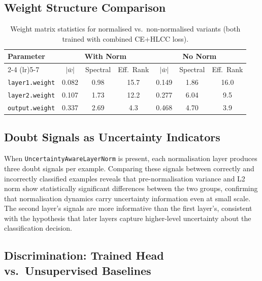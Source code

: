 \documentclass[11pt,a4paper]{article}
\begin{document}
\subsection{Weight Structure Comparison}

\begin{table}[H]
\centering
\caption{Weight matrix statistics for normalised vs.\ non-normalised variants
(both trained with combined CE+HLCC loss).}
\label{tab:weights}
\begin{tabular}{@{}lcccccc@{}}
\toprule
Parameter & \multicolumn{3}{c}{With Norm} & \multicolumn{3}{c}{No Norm} \\
\cmidrule(lr){2-4} \cmidrule(lr){5-7}
 & $|\bar{w}|$ & Spectral & Eff.\ Rank & $|\bar{w}|$ & Spectral & Eff.\ Rank \\
\midrule
\texttt{layer1.weight} & 0.082 & 0.98 & 15.7 & 0.149 & 1.86 & 16.0 \\
\texttt{layer2.weight} & 0.107 & 1.73 & 12.2 & 0.277 & 6.04 & 9.5 \\
\texttt{output.weight} & 0.337 & 2.69 & 4.3  & 0.468 & 4.70 & 3.9 \\
\bottomrule
\end{tabular}
\end{table}

\subsection{Doubt Signals as Uncertainty Indicators}

When \texttt{UncertaintyAwareLayerNorm} is present, each normalisation
layer produces three doubt signals per example.  Comparing these
signals between correctly and incorrectly classified examples reveals
that pre-normalisation variance and L2 norm show statistically
significant differences between the two groups, confirming that
normalisation dynamics carry uncertainty information even at small
scale.  The second layer's signals are more informative than the
first layer's, consistent with the hypothesis that later layers
capture higher-level uncertainty about the classification decision.


\subsection{Discrimination: Trained Head vs.\ Unsupervised Baselines}
\label{sec:discrimination}
\end{document}
